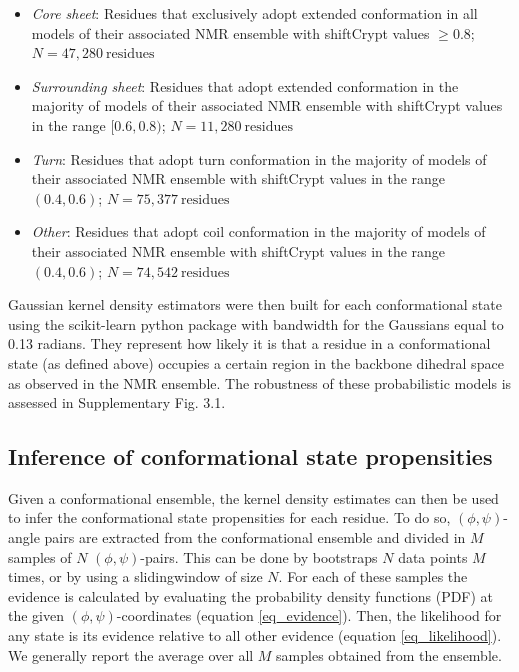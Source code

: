 \begin{itemize}
  \item \textit{Core sheet}: Residues that exclusively adopt extended conformation in all models of their associated NMR ensemble with shiftCrypt values $\ge 0.8$; $N = 47,280 \:\text{residues}$
  \item \textit{Surrounding sheet}: Residues that adopt extended conformation in the majority of models of their associated NMR ensemble with shiftCrypt values in the range $[0.6, 0.8)$; $N = 11,280 \:\text{residues}$
  \item \textit{Turn}: Residues that adopt turn conformation in the majority of models of their associated NMR ensemble with shiftCrypt values in the range $(0.4, 0.6)$; $N = 75,377 \:\text{residues}$
  \item \textit{Other}: Residues that  adopt coil conformation in the majority of models of their associated NMR ensemble with shiftCrypt values in the range $(0.4, 0.6)$; $N = 74,542 \:\text{residues}$
\end{itemize}

Gaussian kernel density estimators were then built for each conformational state using the scikit-learn python package with bandwidth for the Gaussians equal to 0.13 radians. They represent how likely it is that a residue in a conformational state (as defined above) occupies a certain region in the backbone dihedral space as observed in the NMR ensemble. The robustness of these probabilistic models is assessed in Supplementary Fig. 3.1. %

\subsection{Inference of conformational state propensities} \label{inference_conf_states}

Given a conformational ensemble, the kernel density estimates can then be used to infer the conformational state propensities for each residue. To do so, $(\phi, \psi)$-angle pairs  are extracted from the conformational ensemble and divided in $M$ samples of $N$ $(\phi, \psi)$-pairs. This can be done by \glspl{bootstrap} $N$ data points $M$ times, or by using a \gls{slidingwindow} of size $N$. For each of these samples the evidence is calculated by evaluating the probability density functions (PDF) at the given $(\phi, \psi)$-coordinates (equation \ref{eq_evidence}). Then, the likelihood for any state is its evidence relative to all other evidence (equation \ref{eq_likelihood}). We generally report the average over all $M$ samples obtained from the ensemble.

